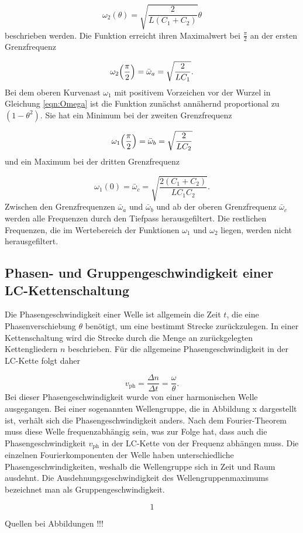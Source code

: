 \begin{equation}
  \omega_2 (\theta) = \sqrt{\frac{2}{L(C_1 + C_2)}} \theta
\end{equation}
beschrieben werden.
Die Funktion erreicht ihren Maximalwert bei $\frac{\pi}{2}$ an
der ersten Grenzfrequenz

\begin{equation}
  \omega_2\Bigl(\frac{\pi}{2}\Bigr) = \bar{\omega}_a = \sqrt{\frac{2}{LC_1}}.
\end{equation}
Bei dem oberen Kurvenast $\omega_1$ mit positivem Vorzeichen vor der Wurzel in
Gleichung \eqref{eqn:Omega} ist die Funktion zunächst annähernd
proportional zu $(1-\theta^2)$.
Sie hat ein Minimum bei der zweiten Grenzfrequenz

\begin{equation}
  \omega_1\Bigl(\frac{\pi}{2}\Bigr) = \bar{\omega}_b = \sqrt{\frac{2}{LC_2}}
\end{equation}
und ein Maximum bei der dritten Grenzfrequenz

\begin{equation}
  \omega_1(0) = \bar{\omega}_c = \sqrt{\frac{2(C_1+C_2)}{LC_1C_2}}.
\end{equation}
Zwischen den Grenzfrequenzen $\bar{\omega}_a$ und $\bar{\omega}_b$ und ab der
oberen Grenzfrequenz $\bar{\omega}_c$ werden alle Frequenzen durch den
Tiefpass herausgefiltert. Die restlichen Frequenzen, die im Wertebereich der
Funktionen $\omega_1$ und $\omega_2$ liegen, werden nicht herausgefiltert.


\subsection{Phasen- und Gruppengeschwindigkeit einer LC-Kettenschaltung}

Die Phasengeschwindigkeit einer Welle ist allgemein die Zeit $t$, die eine
Phasenverschiebung $\theta$ benötigt, um eine bestimmt Strecke zurückzulegen.
In einer Kettenschaltung wird die Strecke durch die Menge an zurückgelegten
Kettengliedern $n$ beschrieben.
Für die allgemeine Phasengeschwindigkeit in der LC-Kette folgt daher

\begin{equation}
  v_\text{ph} = \frac{\Delta n}{\Delta t} = \frac{\omega}{\theta}.
\end{equation}
Bei dieser Phasengeschwindigkeit wurde von einer harmonischen Welle ausgegangen.
Bei einer sogenannten Wellengruppe, die in Abbildung x dargestellt ist,
verhält sich die Phasengeschwindigkeit anders. Nach dem Fourier-Theorem
muss diese Welle frequenzabhängig sein, was zur Folge hat, dass auch die
Phasengeschwindigkeit $v_\text{ph}$ in der LC-Kette von der Frequenz abhängen
muss. Die einzelnen Fourierkomponenten der Welle haben unterschiedliche
Phasengeschwindigkeiten, weshalb die Wellengruppe sich in Zeit und Raum
ausdehnt. Die Ausdehnungsgeschwindigkeit des Wellengruppenmaximums
bezeichnet man als Gruppengeschwindigkeit.


\begin{equation}
1
\end{equation}

Quellen bei Abbildungen !!!


\cite{sample}
